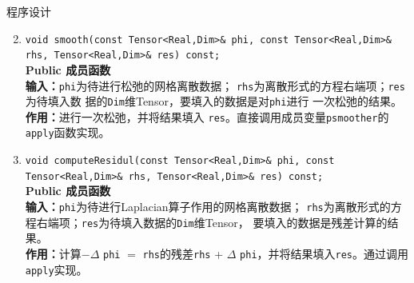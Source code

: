 \documentclass{beamer}
\begin{document}
         \begin{frame}{程序设计}
           \begin{enumerate}[(1)] \setcounter{enumi}{1}
                       \item \texttt{void smooth(const Tensor<Real,Dim>\& phi, const Tensor<Real,Dim>\&
                rhs, Tensor<Real,Dim>\& res) const;}\\
              \textbf{Public 成员函数}\\
            \textbf{输入：}\texttt{phi}为待进行松弛的网格离散数据；
            \texttt{rhs}为离散形式的方程右端项；\texttt{res}为待填入数
            据的\texttt{Dim}维Tensor，要填入的数据是对\texttt{phi}进行
            一次松弛的结果。\\
            \textbf{作用：}进行一次松弛，并将结果填入
            \texttt{res}。直接调用成员变量\texttt{psmoother}的
            \texttt{apply}函数实现。
            \item \texttt{void computeResidul(const Tensor<Real,Dim>\& phi, const Tensor<Real,Dim>\&
                      rhs, Tensor<Real,Dim>\& res) const;}\\
              \textbf{Public 成员函数}\\
            \textbf{输入：}\texttt{phi}为待进行Laplacian算子作用的网格离散数据；
            \texttt{rhs}为离散形式的方程右端项；\texttt{res}为待填入数据的\texttt{Dim}维Tensor，
            要填入的数据是残差计算的结果。\\
            \textbf{作用：}计算$-\Delta$ \texttt{phi} $=$
            \texttt{rhs}的残差\texttt{rhs} + $\Delta$ \texttt{phi}，并将结果填入\texttt{res}。通过调用
            \texttt{apply}实现。

        \end{enumerate}

      \end{frame}
\end{document}
